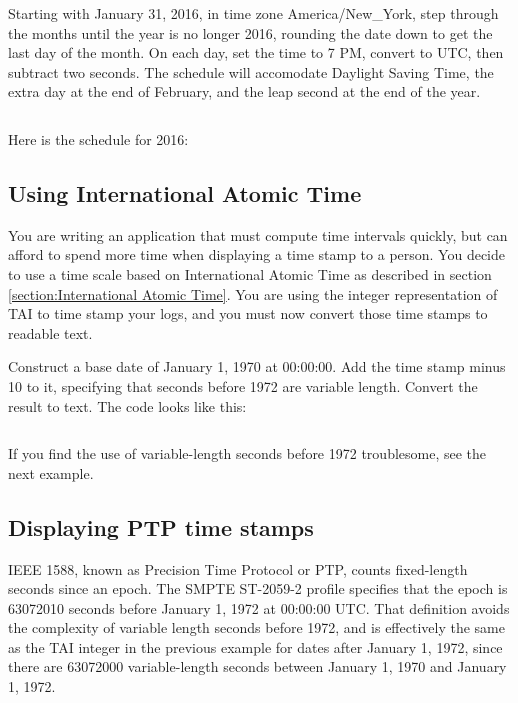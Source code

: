 \documentclass[letterpaper,twoside]{article}
\begin{document}
Starting with January 31, 2016, in time zone America/New\_York,
step through the months until the year is no longer 2016, rounding
the date down to get the last day of the month.
On each day, set the time to 7 PM, convert to UTC, then subtract
two seconds.  The schedule will accomodate Daylight Saving Time,
the extra day at the end of February,
and the leap second at the end of the year.
\inputminted[firstline=45,lastline=81]{c}{examples/example_03.c}

Here is the schedule for 2016:

\subsection{Using International Atomic Time}
\label{example:TAI}
You are writing an application that must compute time intervals quickly,
but can afford to spend more time when displaying a time stamp to a person.
You decide to use a time scale based on International Atomic Time as described
in section \ref{section:International Atomic Time}.  You are using the
integer representation of TAI to time stamp your logs, and you must now convert
those time stamps to readable text.

Construct a base date of January 1, 1970 at 00:00:00.  Add the time stamp
minus 10 to it, specifying that seconds before 1972 are variable length.
Convert the result to text.  The code looks like this:
\inputminted[firstline=41,lastline=67]{c}{examples/example_04.c}

If you find the use of variable-length seconds before 1972 troublesome,
see the next example.

\subsection{Displaying PTP time stamps}
\label{example:PTP}
IEEE 1588, known as Precision Time Protocol or PTP, counts fixed-length
seconds since an epoch.  The SMPTE ST-2059-2 profile specifies that the epoch is
\num{63072010} seconds before January 1, 1972 at 00:00:00 UTC.  That definition
avoids the complexity of variable length seconds before 1972, and is
effectively the same as the TAI integer in the previous example
for dates after January 1, 1972, since there are \num{63072000}
variable-length seconds between January 1, 1970 and January 1, 1972.
\end{document}
